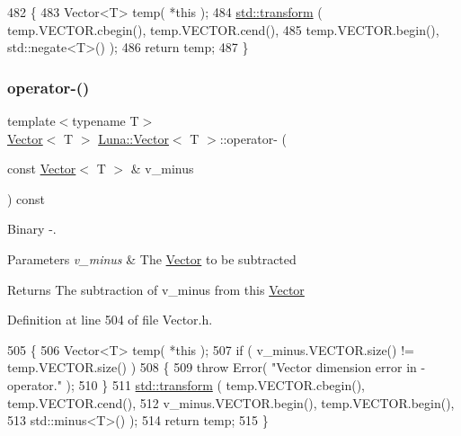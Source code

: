\begin{DoxyCode}
482   \{
483     Vector<T> temp( *\textcolor{keyword}{this} );
484     \hyperlink{namespaceHeat__plot_aeaa6785bedcad63b4bd40e8cb1bad8a0}{std::transform} ( temp.VECTOR.cbegin(), temp.VECTOR.cend(),
485                      temp.VECTOR.begin(), std::negate<T>() );
486     \textcolor{keywordflow}{return} temp;
487   \}
\end{DoxyCode}
\mbox{\label{classLuna_1_1Vector_a6fe350a0e81289f65f9d364d669d434d}} 
\subsubsection{\texorpdfstring{operator-\/()}{operator-()}\hspace{0.1cm}{\footnotesize\ttfamily [2/2]}}
{\footnotesize\ttfamily template$<$typename T$>$ \\
\hyperlink{classLuna_1_1Vector}{Vector}$<$ T $>$ \hyperlink{classLuna_1_1Vector}{Luna\+::\+Vector}$<$ T $>$\+::operator-\/ (\begin{DoxyParamCaption}\item[{const \hyperlink{classLuna_1_1Vector}{Vector}$<$ T $>$ \&}]{v\+\_\+minus }\end{DoxyParamCaption}) const\hspace{0.3cm}{\ttfamily [inline]}}



Binary -\/. 


\begin{DoxyParams}{Parameters}
{\em v\+\_\+minus} & The \hyperlink{classLuna_1_1Vector}{Vector} to be subtracted \\
\hline
\end{DoxyParams}
\begin{DoxyReturn}{Returns}
The subtraction of v\+\_\+minus from this \hyperlink{classLuna_1_1Vector}{Vector} 
\end{DoxyReturn}


Definition at line 504 of file Vector.\+h.


\begin{DoxyCode}
505   \{
506     Vector<T> temp( *\textcolor{keyword}{this} );
507     \textcolor{keywordflow}{if} ( v\_minus.VECTOR.size() != temp.VECTOR.size() )
508     \{
509       \textcolor{keywordflow}{throw} Error( \textcolor{stringliteral}{"Vector dimension error in - operator."} );
510     \}
511     \hyperlink{namespaceHeat__plot_aeaa6785bedcad63b4bd40e8cb1bad8a0}{std::transform} ( temp.VECTOR.cbegin(), temp.VECTOR.cend(),
512                      v\_minus.VECTOR.begin(), temp.VECTOR.begin(),
513                      std::minus<T>() );
514     \textcolor{keywordflow}{return} temp;
515   \}
\end{DoxyCode}
\mbox{\label{classLuna_1_1Vector_a1be4f350f70c6bd70032da8d5a2329ef}} 
